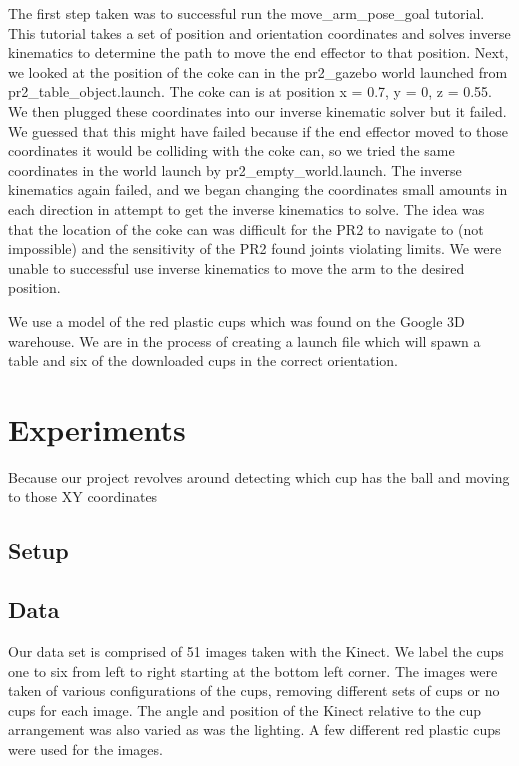 \documentclass[letterpaper, 10 pt, conference]{ieeeconf}  %
\begin{document}
The first step taken was to successful run the move\_arm\_pose\_goal tutorial. This tutorial takes a set of position and orientation coordinates and solves inverse kinematics to determine the path to move the end effector to that position. Next, we looked at the position of the coke can in the pr2\_gazebo world launched from pr2\_table\_object.launch. The coke can is at position x = 0.7, y = 0, z = 0.55. We then plugged these coordinates into our inverse kinematic solver but it failed. We guessed that this might have failed because if the end effector moved to those coordinates it would be colliding with the coke can, so we tried the same coordinates in the world launch by pr2\_empty\_world.launch. The inverse kinematics again failed, and we began changing the coordinates small amounts in each direction in attempt to get the inverse kinematics to solve. The idea was that the location of the coke can was difficult for the PR2 to navigate to (not impossible) and the sensitivity of the PR2 found joints violating limits. We were unable to successful use inverse kinematics to move the arm to the desired position.

We use a model of the red plastic cups which was found on the Google 3D warehouse. We are in the process of creating a launch file which will spawn a table and six of the downloaded cups in the correct orientation.


\section{Experiments}

Because our project revolves around detecting which cup has the ball and moving to those XY coordinates

\subsection{Setup}

\subsection{Data}

Our data set is comprised of 51 images taken with the Kinect. We label the cups one to six from left to right starting at the bottom left corner. The images were taken of various configurations of the cups, removing different sets of cups or no cups for each image. The angle and position of the Kinect relative to the cup arrangement was also varied as was the lighting.  A few different red plastic cups were used for the images. 
\end{document}
